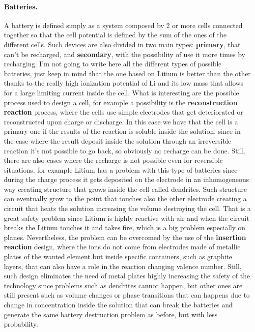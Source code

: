 \paragraph{Batteries.} A battery is defined simply as a system composed by 2 or more cells connected together so that the cell potential is defined by the sum of the ones of the different cells. Such devices are also divided in two main types: \textbf{primary}, that can't be recharged, and \textbf{secondary}, with the possibility of use it more times by recharging. I'm not going to write here all the different types of possible batteries, just keep in mind that the one based on Litium is better than the other thanks to the really high ionization potential of Li and its low mass that allows for a large limiting current inside the cell. What is interesting are the possible process used to design a cell, for example a possibility is the \textbf{reconstruction reaction} process, where the cells use simple electrodes that get deteriorated or reconstructed upon charge or discharge. In this case we have that the cell is a primary one if the results of the reaction is soluble inside the solution, since in the case where the result deposit inside the solution through an irreversible reaction it's not possible to go back, so obviously no recharge can be done. Still, there are also cases where the recharge is not possible even for reversible situations, for example Litium has a problem with this type of batteries since during the charge process it gets deposited on the electrode in an inhomogeneous way creating structure that grows inside the cell called dendrites. Such structure can eventually grow to the point that touches also the other electrode creating a circuit that heats the solution increasing the volume destroying the cell. That is a great safety problem since Litium is highly reactive with air and when the circuit breaks the Litium touches it and takes fire, which is a big problem especially on planes. Nevertheless, the problem can be overcomed by the use of the \textbf{insertion reaction} design, where the ions do not come from electrodes made of metallic plates of the wanted element but inside specific containers, such as graphite layers, that can also have a role in the reaction changing valence number. Still, such design eliminates the need of metal plates highly increasing the safety of the technology since problems such as dendrites cannot happen, but other ones are still present such as volume changes or phase transitions that can happens due to change in concentration inside the solution that can break the batteries and generate the same battery destruction problem as before, but with less probability.
